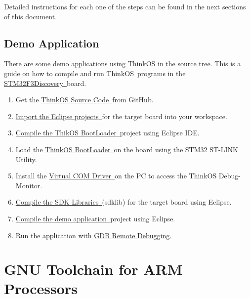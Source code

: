 {Detailed instructions for each one of the steps can be found in the
next sections of this document. }

\subsection{\texorpdfstring{{Demo
Application}}{Demo Application}}\label{demo-application}

{There are some demo applications using ThinkOS in the source tree. This
is a guide on how to compile and run }{ThinkOS}{~programs in the
}{\protect\hyperlink{h.35nkun2}{STM32F3Discovery}}{\protect\hyperlink{h.35nkun2}{~}}{board.
}

\begin{enumerate}
\tightlist
\item
  {Get the }{\protect\hyperlink{h.2s8eyo1}{ThinkOS Source
  Code}}{\protect\hyperlink{h.2s8eyo1}{~}}{from GitHub.}
\item
  {\protect\hyperlink{h.17dp8vu}{Import the Eclipse
  projects}}{\protect\hyperlink{h.17dp8vu}{~}}{for the target board into
  your workspace.}
\item
  {\protect\hyperlink{h.3rdcrjn}{Compile the ThikOS
  BootLoader}}{\protect\hyperlink{h.3rdcrjn}{~}}{project using Eclipse
  IDE.}
\item
  {Load the }{\protect\hyperlink{h.1ksv4uv}{ThinkOS
  BootLoader}}{\protect\hyperlink{h.1ksv4uv}{~}}{on the board using the
  }{STM32 ST-LINK Utility}{.}
\item
  {Install the }{\protect\hyperlink{h.44sinio}{Virtual COM
  Driver}}{\protect\hyperlink{h.44sinio}{~}}{on the PC to access the
  }{ThinkOS Debug-Monitor}{.}
\item
  {\protect\hyperlink{h.26in1rg}{Compile the SDK
  Libraries}}{\protect\hyperlink{h.26in1rg}{~}}{(sdklib) for the target
  board using Eclipse.}
\item
  {\protect\hyperlink{h.lnxbz9}{Compile the demo
  application}}{\protect\hyperlink{h.lnxbz9}{~}}{project using Eclipse.}
\item
  {Run the application with }{\protect\hyperlink{h.2jxsxqh}{GDB Remote
  Debugging}}{\protect\hyperlink{h.2jxsxqh}{.}}
\end{enumerate}

\hypertarget{h.30j0zll}{\section{\texorpdfstring{{GNU Toolchain for ARM
Processors}}{GNU Toolchain for ARM Processors}}\label{h.30j0zll}}

